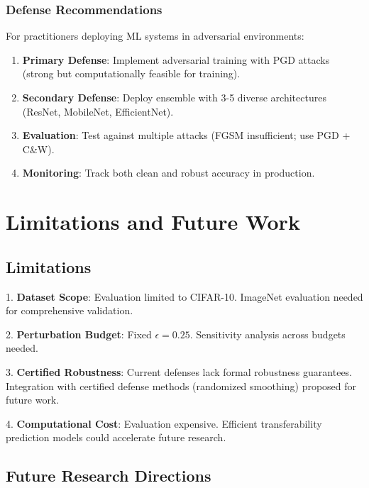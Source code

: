 \documentclass[10pt,conference]{IEEEtran}
\begin{document}
\subsubsection{Defense Recommendations}

For practitioners deploying ML systems in adversarial environments:

\begin{enumerate}
    \item \textbf{Primary Defense}: Implement adversarial training with PGD attacks (strong but computationally feasible for training).
    
    \item \textbf{Secondary Defense}: Deploy ensemble with 3-5 diverse architectures (ResNet, MobileNet, EfficientNet).
    
    \item \textbf{Evaluation}: Test against multiple attacks (FGSM insufficient; use PGD + C\&W).
    
    \item \textbf{Monitoring}: Track both clean and robust accuracy in production.
\end{enumerate}

\section{Limitations and Future Work}

\subsection{Limitations}

1. \textbf{Dataset Scope}: Evaluation limited to CIFAR-10. ImageNet evaluation needed for comprehensive validation.

2. \textbf{Perturbation Budget}: Fixed $\epsilon = 0.25$. Sensitivity analysis across budgets needed.

3. \textbf{Certified Robustness}: Current defenses lack formal robustness guarantees. Integration with certified defense methods (randomized smoothing) proposed for future work.

4. \textbf{Computational Cost}: Evaluation expensive. Efficient transferability prediction models could accelerate future research.

\subsection{Future Research Directions}
\end{document}
